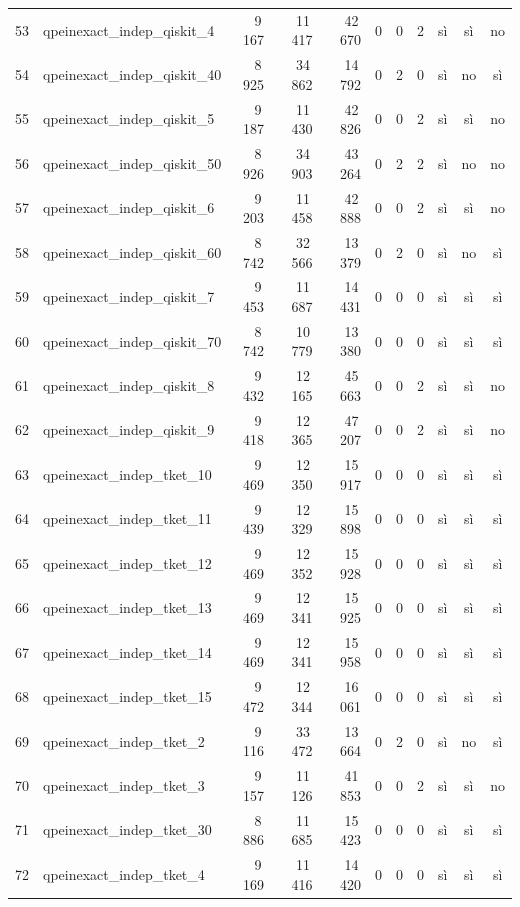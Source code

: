 \documentclass[a4paper,10pt]{article}
\begin{document}
\begin{landscape}
\begin{longtable}{r l rrr rrr ccc}
53 & qpeinexact\_indep\_qiskit\_4 & 9\,167 & 11\,417 & 42\,670 & 0 & 0 & 2 & sì & sì & no\\
54 & qpeinexact\_indep\_qiskit\_40 & 8\,925 & 34\,862 & 14\,792 & 0 & 2 & 0 & sì & no & sì\\
55 & qpeinexact\_indep\_qiskit\_5 & 9\,187 & 11\,430 & 42\,826 & 0 & 0 & 2 & sì & sì & no\\
56 & qpeinexact\_indep\_qiskit\_50 & 8\,926 & 34\,903 & 43\,264 & 0 & 2 & 2 & sì & no & no\\
57 & qpeinexact\_indep\_qiskit\_6 & 9\,203 & 11\,458 & 42\,888 & 0 & 0 & 2 & sì & sì & no\\
58 & qpeinexact\_indep\_qiskit\_60 & 8\,742 & 32\,566 & 13\,379 & 0 & 2 & 0 & sì & no & sì\\
59 & qpeinexact\_indep\_qiskit\_7 & 9\,453 & 11\,687 & 14\,431 & 0 & 0 & 0 & sì & sì & sì\\
60 & qpeinexact\_indep\_qiskit\_70 & 8\,742 & 10\,779 & 13\,380 & 0 & 0 & 0 & sì & sì & sì\\
61 & qpeinexact\_indep\_qiskit\_8 & 9\,432 & 12\,165 & 45\,663 & 0 & 0 & 2 & sì & sì & no\\
62 & qpeinexact\_indep\_qiskit\_9 & 9\,418 & 12\,365 & 47\,207 & 0 & 0 & 2 & sì & sì & no\\
63 & qpeinexact\_indep\_tket\_10 & 9\,469 & 12\,350 & 15\,917 & 0 & 0 & 0 & sì & sì & sì\\
64 & qpeinexact\_indep\_tket\_11 & 9\,439 & 12\,329 & 15\,898 & 0 & 0 & 0 & sì & sì & sì\\
65 & qpeinexact\_indep\_tket\_12 & 9\,469 & 12\,352 & 15\,928 & 0 & 0 & 0 & sì & sì & sì\\
66 & qpeinexact\_indep\_tket\_13 & 9\,469 & 12\,341 & 15\,925 & 0 & 0 & 0 & sì & sì & sì\\
67 & qpeinexact\_indep\_tket\_14 & 9\,469 & 12\,341 & 15\,958 & 0 & 0 & 0 & sì & sì & sì\\
68 & qpeinexact\_indep\_tket\_15 & 9\,472 & 12\,344 & 16\,061 & 0 & 0 & 0 & sì & sì & sì\\
69 & qpeinexact\_indep\_tket\_2 & 9\,116 & 33\,472 & 13\,664 & 0 & 2 & 0 & sì & no & sì\\
70 & qpeinexact\_indep\_tket\_3 & 9\,157 & 11\,126 & 41\,853 & 0 & 0 & 2 & sì & sì & no\\
71 & qpeinexact\_indep\_tket\_30 & 8\,886 & 11\,685 & 15\,423 & 0 & 0 & 0 & sì & sì & sì\\
72 & qpeinexact\_indep\_tket\_4 & 9\,169 & 11\,416 & 14\,420 & 0 & 0 & 0 & sì & sì & sì\\

\end{longtable}
\end{landscape}
\end{document}
